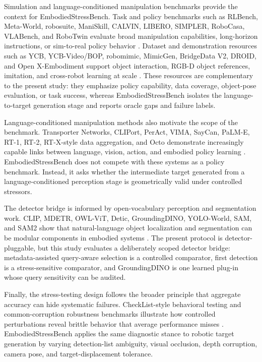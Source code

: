 Simulation and language-conditioned manipulation benchmarks provide the context for EmbodiedStressBench. Task and policy benchmarks such as RLBench, Meta-World, robosuite, ManiSkill, CALVIN, LIBERO, SIMPLER, RoboCasa, VLABench, and RoboTwin evaluate broad manipulation capabilities, long-horizon instructions, or sim-to-real policy behavior \cite{james2020rlbench,yu2020metaworld,zhu2020robosuite,gu2021maniskill,gu2023maniskill2,mees2022calvin,liu2023libero,li2024simpler,nasiriany2024robocasa,zhang2024vlabench,mu2025robotwin}. Dataset and demonstration resources such as YCB, YCB-Video/BOP, robomimic, MimicGen, BridgeData V2, DROID, and Open X-Embodiment support object interaction, RGB-D object references, imitation, and cross-robot learning at scale \cite{calli2017ycb,xiang2018posecnn,hodan2018bop,mandlekar2021robomimic,mandlekar2023mimicgen,walke2023bridgedatav2,khazatsky2024droid,openx2023}. These resources are complementary to the present study: they emphasize policy capability, data coverage, object-pose evaluation, or task success, whereas EmbodiedStressBench isolates the language-to-target generation stage and reports oracle gaps and failure labels.

Language-conditioned manipulation methods also motivate the scope of the benchmark. Transporter Networks, CLIPort, PerAct, VIMA, SayCan, PaLM-E, RT-1, RT-2, RT-X-style data aggregation, and Octo demonstrate increasingly capable links between language, vision, action, and embodied policy learning \cite{zeng2021transporter,shridhar2022cliport,shridhar2022peract,jiang2023vima,ahn2022saycan,driess2023palme,brohan2023rt1,brohan2023rt2,openx2023,ghosh2024octo}. EmbodiedStressBench does not compete with these systems as a policy benchmark. Instead, it asks whether the intermediate target generated from a language-conditioned perception stage is geometrically valid under controlled stressors.

The detector bridge is informed by open-vocabulary perception and segmentation work. CLIP, MDETR, OWL-ViT, Detic, GroundingDINO, YOLO-World, SAM, and SAM2 show that natural-language object localization and segmentation can be modular components in embodied systems \cite{radford2021clip,kamath2021mdetr,minderer2022owlvit,zhou2022detic,liu2023groundingdino,cheng2024yoloworld,kirillov2023sam,ravi2024sam2}. The present protocol is detector-pluggable, but this study evaluates a deliberately scoped detector bridge: metadata-assisted query-aware selection is a controlled comparator, first detection is a stress-sensitive comparator, and GroundingDINO is one learned plug-in whose query sensitivity can be audited.

Finally, the stress-testing design follows the broader principle that aggregate accuracy can hide systematic failures. CheckList-style behavioral testing and common-corruption robustness benchmarks illustrate how controlled perturbations reveal brittle behavior that average performance misses \cite{ribeiro2020checklist,hendrycks2019robustness}. EmbodiedStressBench applies the same diagnostic stance to robotic target generation by varying detection-list ambiguity, visual occlusion, depth corruption, camera pose, and target-displacement tolerance.
